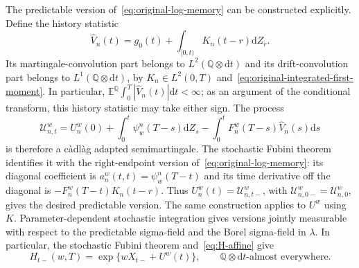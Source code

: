 \documentclass[11pt]{article}
\theoremstyle{definition}
\theoremstyle{remark}
\newcommand{\E}{\mathbb{E}}
\newcommand{\Q}{\mathbb{Q}}
\newcommand{\1}{\mathbf{1}}
\newcommand{\dd}{\mathrm{d}}
\begin{document}
The predictable version of~\eqref{eq:original-log-memory} can be constructed
explicitly. Define the history statistic
\[
 \widehat V_n(t)=g_0(t)+\int_{[0,t)}K_n(t-r)\dd Z_r.
\]
Its martingale-convolution part belongs to $L^2(\Q\otimes\dd t)$ and its
drift-convolution part belongs to $L^1(\Q\otimes\dd t)$, by
$K_n\in L^2(0,T)$ and~\eqref{eq:original-integrated-first-moment}.
In particular, $\E^\Q\int_0^T|\widehat V_n(t)|\dd t<\infty$;
as an argument of the conditional transform, this history statistic may take
either sign.
The process
\begin{equation}
\label{eq:original-memory-semimartingale}
 \mathscr U_{n,t}^w=U_n^w(0)
 +\int_0^t\psi_w^n(T-s)\dd Z_s
 -\int_0^t F_n^w(T-s)\widehat V_n(s)\dd s
\end{equation}
 is therefore a c\`adl\`ag adapted semimartingale. The stochastic Fubini theorem identifies
it with the right-endpoint version of~\eqref{eq:original-log-memory}:
its diagonal coefficient is $a_n^w(t,t)=\psi_w^n(T-t)$ and its time
derivative off the diagonal is $-F_n^w(T-t)K_n(t-r)$.
Thus $U_n^w(t)=\mathscr U_{n,t-}^w$, with
$\mathscr U_{n,0-}^w=\mathscr U_{n,0}^w$, gives the desired predictable version.
The same construction applies to $U^w$ using $K$. Parameter-dependent
stochastic integration gives versions jointly measurable with respect to
the predictable sigma-field and the Borel sigma-field in $\lambda$.
 In particular, the stochastic Fubini theorem and~\eqref{eq:H-affine} give
\begin{equation}
\label{eq:original-predictable-transform}
 H_{t-}(w,T)=\exp\{wX_{t-}+U^w(t)\},
 \qquad \Q\otimes\dd t\text{-almost everywhere}.
\end{equation}
\end{document}
